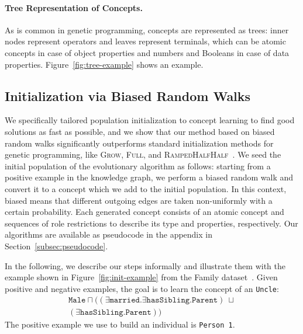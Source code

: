 \paragraph{Tree Representation of Concepts.}
As is common in genetic programming, concepts are represented as trees: inner nodes represent operators and leaves represent terminals, which can be atomic concepts in case of object properties and numbers and Booleans in case of data properties. Figure~\ref{fig:tree-example} shows an example.



\subsection{Initialization via Biased Random Walks}%
\label{subsec:initialization}

We specifically tailored population initialization to concept learning to find good solutions as fast as possible, and we show that our method based on biased random walks significantly outperforms standard initialization methods for genetic pro\-gram\-ming, like \textsc{Grow}, \textsc{Full}, and \textsc{RampedHalfHalf}~\citep{Koza1992GP}. We seed the initial population of the evolutionary algorithm as follows: starting from a positive example in the knowledge graph, we perform a biased random walk and convert it to a concept which we add to the initial population. In this context, biased means that different outgoing edges are taken non-uniformly with a certain probability. Each generated concept consists of an atomic concept and sequences of role restrictions to describe its type and properties, respectively. Our algorithms are available as pseudocode in the appendix in Section~\ref{subsec:pseudocode}.

In the following, we describe our steps informally and illustrate them with the example shown in Figure~\ref{fig:init-example} from the Family dataset~\citep{Richards1995Automated}. Given positive and negative examples, the goal is to learn the concept of an \texttt{Uncle}:
\begin{equation}
\begin{split}
	\texttt{Male} \sqcap ((\exists \texttt{married.}\exists \texttt{hasSibling.Parent}) \ \sqcup \\ (\exists \texttt{hasSibling.Parent}))%
	\label{eq:expected-solution}
\end{split}
\end{equation}
The positive example we use to build an individual is \texttt{Person 1}.

